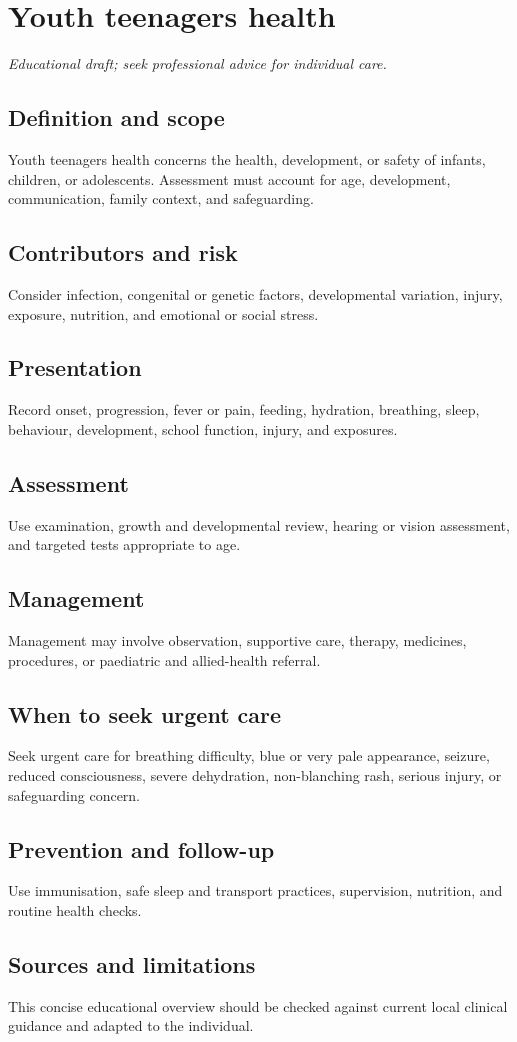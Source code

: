 \chapter{Youth teenagers health}
\medskip
\noindent\textit{Educational draft; seek professional advice for individual care.}

\section*{Definition and scope}
Youth teenagers health concerns the health, development, or safety of infants, children, or adolescents. Assessment must account for age, development, communication, family context, and safeguarding.

\section*{Contributors and risk}
Consider infection, congenital or genetic factors, developmental variation, injury, exposure, nutrition, and emotional or social stress.

\section*{Presentation}
Record onset, progression, fever or pain, feeding, hydration, breathing, sleep, behaviour, development, school function, injury, and exposures.

\section*{Assessment}
Use examination, growth and developmental review, hearing or vision assessment, and targeted tests appropriate to age.

\section*{Management}
Management may involve observation, supportive care, therapy, medicines, procedures, or paediatric and allied-health referral.

\section*{When to seek urgent care}
Seek urgent care for breathing difficulty, blue or very pale appearance, seizure, reduced consciousness, severe dehydration, non-blanching rash, serious injury, or safeguarding concern.

\section*{Prevention and follow-up}
Use immunisation, safe sleep and transport practices, supervision, nutrition, and routine health checks.

\section*{Sources and limitations}
This concise educational overview should be checked against current local clinical guidance and adapted to the individual.
